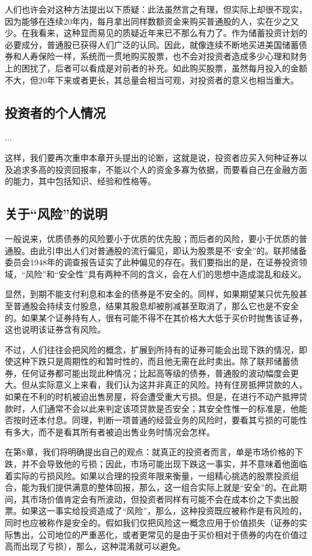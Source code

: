 \documentclass[12pt,oneside]{book}
\begin{document}
人们也许会对这种方法提出以下质疑：此法虽然言之有理，但实际上却很不现实，因为能够在连续20年内，每月拿出同样数额资金来购买普通股的人，实在少之又少。在我看来，这种显而易见的质疑近年来已不那么有力了。作为储蓄投资计划的必要成分，普通股已获得人们广泛的认同。因此，就像连续不断地买进美国储蓄债券和人寿保险一样，系统而一贯地购买股票，也不会对投资者造成多少心理和财务上的困扰了，后者可以看成是对前者的补充。如此购买股票，虽然每月投入的金额不大，但20年下来或者更长，其总量会相当可观，对投资者的意义也相当重大。

\subsection{投资者的个人情况}
...

这样，我们要再次重申本章开头提出的论断，这就是说，投资者应买入何种证券以及追求多高的投资回报率，不能以个人的资金多寡为依据，而要看自己在金融方面的能力，其中包括知识、经验和性格等。

\subsection{关于“风险”的说明}
一般说来，优质债券的风险要小于优质的优先股；而后者的风险，要小于优质的普通股。由此引申出人们对普通股的流行偏见，即认为股票是不“安全”的。联邦储备委员会1948年的调查报告证实了此种偏见的存在。我们要指出的是，在证券投资领域，“风险”和“安全性”具有两种不同的含义，会在人们的思想中造成混乱和歧义。

显然，到期不能支付利息和本金的债券是不安全的。同样，如果期望某只优先股甚至普通股会持续支付股息，结果其股息却被削减甚至取消了，那么它也是不安全的。如果某个证券持有人，很有可能不得不在其价格大大低于买价时抛售该证券，这也说明该证券含有风险。

不过，人们往往会把风险的概念，扩展到所持有的证券可能会出现下跌的情况，即使这种下跌只是周期性的和暂时性的，而且他无需在此时卖出。除了联邦储蓄债券，任何证券都可能出现此种情况；比起高等级的债券，普通股的波动幅度会更大。但从实际意义上来看，我们认为这并非真正的风险。持有住房抵押贷款的人，如果在不利的时机被迫出售房屋，将会遭受重大亏损。但是，在进行不动产抵押贷款时，人们通常不会以此来判定该项贷款是否安全；其安全性惟一的标准是，他能否按时还本付息。同理，判断一项普通的经营业务的风险时，要看其亏损的可能性有多大，而不是看其所有者被迫出售业务时情况会怎样。

在第8章，我们将明确提出自己的观点：就真正的投资者而言，单是市场价格的下跌，并不会导致他的亏损；因此，市场可能出现下跌这一事实，并不意味着他面临着实际的亏损风险。如果以合理的投资年限来衡量，一组精心挑选的股票投资组合，能为我们提供满意的整体回报，那么，这一组合实际上就是“安全”的。在此期间，其市场价值肯定会有所波动，但投资者同样有可能不会在成本价之下卖出股票。如果这一事实给投资造成了“风险”，那么，这种投资既应被称作是有风险的，同时也应被称作是安全的。假如我们仅把风险这一概念应用于价值损失（证券的实际售出，公司地位的严重恶化，或者更常见的是由于买价相对于债券的内在价值过高而出现了亏损），那么，这种混淆就可以避免。
\end{document}
